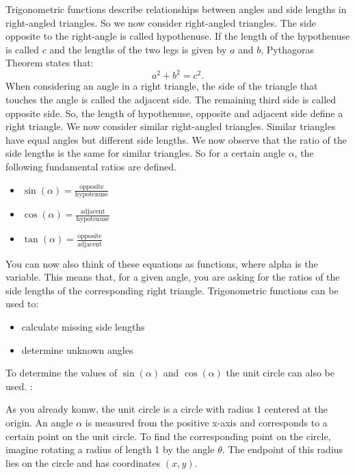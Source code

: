 Trigonometric functions describe relationships between angles and side lengths in right-angled triangles. So we now consider right-angled triangles. The side opposite to the right-angle is called hypothenuse. If the length of the hypothenuse is called $c$ and the lengths of the two legs is given by $a$ and $b$, Pythagoras Theorem states that: 
\begin{equation}
    a^2+b^2=c^2.
\end{equation}
When considering an angle in a right triangle, the side of the triangle that touches the angle is called the adjacent side. The remaining third side is called opposite side. So, the length of hypothenuse, opposite and adjacent side define a right triangle. 
We now consider similar right-angled triangles. Similar triangles have equal angles but different side lengths.
We now observe that the ratio of the side lengths is the same for similar triangles. So for a certain angle $\alpha $, the following fundamental ratios are defined. 
\begin{itemize}
    \item $\sin(\alpha) = \frac{\text{opposite}}{\text{hypotenuse}}$
    \item $\cos(\alpha) = \frac{\text{adjacent}}{\text{hypotenuse}}$
    \item $\tan(\alpha) = \frac{\text{opposite}}{\text{adjacent}}$
\end{itemize}
You can now also think of these equations as functions, where alpha is the variable. This means that, for a given angle, you are asking for the ratios of the side lengths of the corresponding right triangle. 
Trigonometric functions can be used to:
\begin{itemize}
    \item calculate missing side lengths
    \item determine unknown angles
\end{itemize}

To determine the values of $\sin(\alpha)$ and $\cos(\alpha)$ the unit circle can also be used. :

As you already komw, the  unit circle is a circle with radius $1$ centered at the origin. An angle $\alpha$ is measured from the positive x-axis and corresponds to a certain point on the unit circle. To find the corresponding point on the circle, imagine rotating a radius of length 1 by the angle $\theta$. The endpoint of this radius lies on the circle and has coordinates $(x,y)$.

